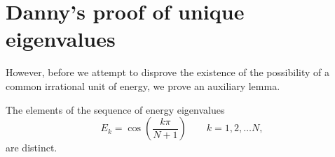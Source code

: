 \documentclass[a4paper,10pt]{article}
\title{}
\author{}
\begin{document}
\maketitle

\begin{abstract}

\end{abstract}

\section{Danny's proof of unique eigenvalues}
However, before
we attempt to disprove the existence of the possibility of a common irrational
unit of energy, we prove an auxiliary lemma.

\begin{lemma}
    The elements of the sequence of energy eigenvalues
    \begin{equation*}
        E_{k} = \cos{\!\left ( \frac{k \pi}{N+1} \right )}
        \qquad k=1, 2, \dots N,
    \end{equation*}
    are distinct.
\end{lemma}
\end{document}
